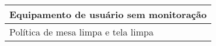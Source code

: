 \documentclass[portuguese,oneside]{tcc}
\begin{document}
\begin{table}[!t]
\begin{center}
\begin{tabular}{|l|}
Equipamento de usuário sem monitoração                                                                                                                                                                                       \\ \hline
Política de mesa limpa e tela limpa                                                                                                                                                                                          \\ \hline
\end{tabular}
\end{center}
\end{table}

\end{document}
